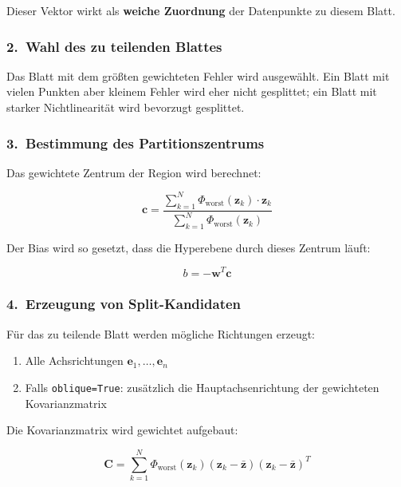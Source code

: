 \documentclass[11pt,a4paper]{report}
\begin{document}
	Dieser Vektor wirkt als \textbf{weiche Zuordnung} der Datenpunkte zu diesem Blatt.
	
	\subsubsection*{2.~Wahl des zu teilenden Blattes}
	
	Das Blatt mit dem grö\ss{}ten gewichteten Fehler wird ausgewählt. Ein Blatt mit vielen Punkten aber kleinem Fehler wird eher nicht gesplittet; ein Blatt mit starker Nichtlinearität wird bevorzugt gesplittet.
	
	\subsubsection*{3.~Bestimmung des Partitionszentrums}
	
	Das gewichtete Zentrum der Region wird berechnet:
	
	\begin{equation}
		\mathbf{c} = \frac{\sum_{k=1}^{N} \Phi_{\mathrm{worst}}(\mathbf{z}_k) \cdot \mathbf{z}_k}{\sum_{k=1}^{N} \Phi_{\mathrm{worst}}(\mathbf{z}_k)}
	\end{equation}
	
	Der Bias wird so gesetzt, dass die Hyperebene durch dieses Zentrum läuft:
	
	\begin{equation}
		b = -\mathbf{w}^T \mathbf{c}
	\end{equation}
	
	\subsubsection*{4.~Erzeugung von Split-Kandidaten}
	
	Für das zu teilende Blatt werden mögliche Richtungen erzeugt:
	\begin{enumerate}
		\item Alle Achsrichtungen $\mathbf{e}_1, \ldots, \mathbf{e}_n$
		\item Falls \texttt{oblique=True}: zusätzlich die Hauptachsenrichtung der gewichteten Kovarianzmatrix
	\end{enumerate}
	
	Die Kovarianzmatrix wird gewichtet aufgebaut:
	
	\begin{equation}
		\mathbf{C} = \sum_{k=1}^{N} \Phi_{\mathrm{worst}}(\mathbf{z}_k) (\mathbf{z}_k - \bar{\mathbf{z}})(\mathbf{z}_k - \bar{\mathbf{z}})^T
	\end{equation}
	
\end{document}
